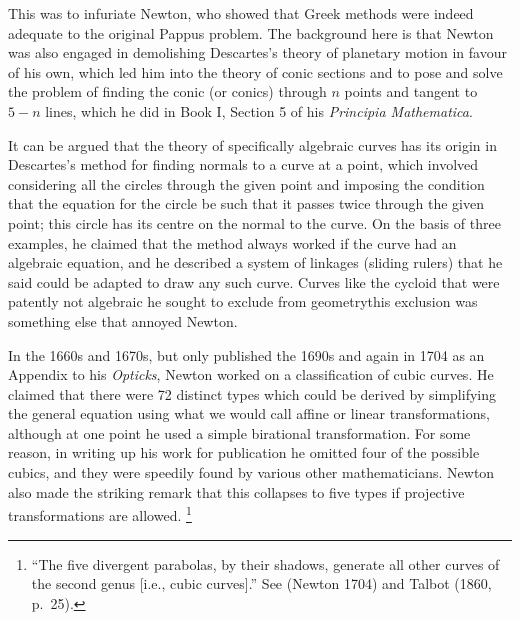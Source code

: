 This was to infuriate Newton, who showed that Greek methods were
indeed adequate to the original Pappus problem. The background here
is that Newton was also engaged in demolishing Descartes's theory of
planetary motion in favour of his own, which led him into the theory
of conic sections and to pose and solve the problem of finding
the conic (or conics) through $n$ points and tangent to $5-n$
lines, which he did in Book I, Section 5 of his \emph{Principia
Mathematica}.~\label{Newtonconics}

It can be argued that the theory of specifically algebraic curves has its
origin in Descartes's method for finding normals to a curve at a point,
which  involved considering all the circles through the given point and
imposing the condition that the equation for the circle be such that it
passes twice through the given point; this circle has its centre on the
normal to the curve. On the basis of three examples, he claimed that
the method always worked  if the curve had an algebraic equation, and
he described a system of linkages (sliding rulers) that he said could
be adapted to draw any such curve. Curves like the cycloid that were
patently not algebraic he sought to exclude from geometry\emdash this
exclusion was something else that annoyed Newton.

In the 1660s and 1670s, but only published  the 1690s and again in
1704 as an Appendix to his \emph{Opticks}, Newton worked on a
classification of cubic curves. He claimed that there were 72 distinct
types which could be derived by simplifying the general equation using
what we would call affine or linear transformations, although at one
point he used a simple birational transformation. For some reason, in
writing up his work for publication he omitted four of the possible
cubics, and they were speedily found by various other mathematicians.
Newton also made the striking remark that this collapses to five types
if projective transformations are allowed.%
\footnote{``The five divergent parabolas, by their shadows, generate
  all other curves of the second genus [i.e., cubic curves].'' See
  (Newton  1704) and Talbot (1860, p.~25).}





